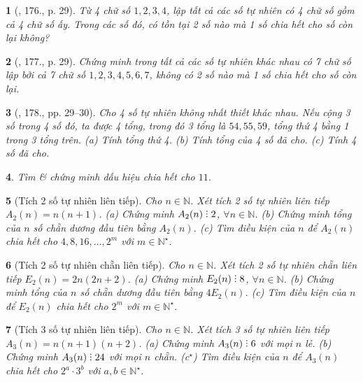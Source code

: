 \documentclass{article}
\newtheorem{baitoan}{}
\DeclareRobustCommand{\divby}{%
	\mathrel{\vbox{\baselineskip.65ex\lineskiplimit0pt\hbox{.}\hbox{.}\hbox{.}}}%
}
\begin{document}
\begin{baitoan}[\cite{Binh_Toan_6_tap_1}, 176., p. 29]
	Từ 4 chữ số $1,2,3,4$, lập tất cả các số tự nhiên có 4 chữ số gồm cả 4 chữ số ấy. Trong các số đó, có tồn tại 2 số nào mà 1 số chia hết cho số còn lại không?
\end{baitoan}

\begin{baitoan}[\cite{Binh_Toan_6_tap_1}, 177., p. 29]
	Chứng minh trong tất cả các số tự nhiên khác nhau có 7 chữ số lập bởi cả 7 chữ số $1,2,3,4,5,6,7$, không có 2 số nào mà 1 số chia hết cho số còn lại.
\end{baitoan}

\begin{baitoan}[\cite{Binh_Toan_6_tap_1}, 178., pp. 29--30]
	Cho 4 số tự nhiên không nhất thiết khác nhau. Nếu cộng 3 số trong 4 số đó, ta được 4 tổng, trong đó 3 tổng là $54,55,59$, tổng thứ 4 bằng 1 trong 3 tổng trên. (a) Tính tổng thứ 4. (b) Tính tổng của 4 số đã cho. (c) Tính 4 số đã cho.
\end{baitoan}

\begin{baitoan}
	Tìm \& chứng minh dấu hiệu chia hết cho $11$.
\end{baitoan}

\begin{baitoan}[Tích 2 số tự nhiên liên tiếp]
	Cho $n\in\mathbb{N}$. Xét tích 2 số tự nhiên liên tiếp $A_2(n) = n(n + 1)$. (a) Chứng minh $A_2(n)\divby2$, $\forall n\in\mathbb{N}$. (b) Chứng minh tổng của $n$ số chẵn dương đầu tiên bằng $A_2(n)$. (c) Tìm điều kiện của $n$ để $A_2(n)$ chia hết cho $4,8,16,\ldots,2^m$ với $m\in\mathbb{N}^\star$.
\end{baitoan}

\begin{baitoan}[Tích 2 số tự nhiên chẵn liên tiếp]
	Cho $n\in\mathbb{N}$. Xét tích 2 số tự nhiên chẵn liên tiếp $E_2(n) = 2n(2n + 2)$. (a) Chứng minh $E_2(n)\divby8$, $\forall n\in\mathbb{N}$. (b) Chứng minh tổng của $n$ số chẵn dương đầu tiên bằng $4E_2(n)$. (c) Tìm điều kiện của $n$ để $E_2(n)$ chia hết cho $2^m$ với $m\in\mathbb{N}^\star$.
\end{baitoan}

\begin{baitoan}[Tích 3 số tự nhiên liên tiếp]
	Cho $n\in\mathbb{N}$. Xét tích 3 số tự nhiên liên tiếp $A_3(n) = n(n + 1)(n + 2)$. (a) Chứng minh $A_3(n)\divby6$ với mọi $n$ lẻ. (b) Chứng minh $A_3(n)\divby24$ với mọi $n$ chẵn. (c${}^\star$) Tìm điều kiện của $n$ để $A_3(n)$ chia hết cho $2^a\cdot3^b$ với $a,b\in\mathbb{N}^\star$.
\end{baitoan}
\end{document}
